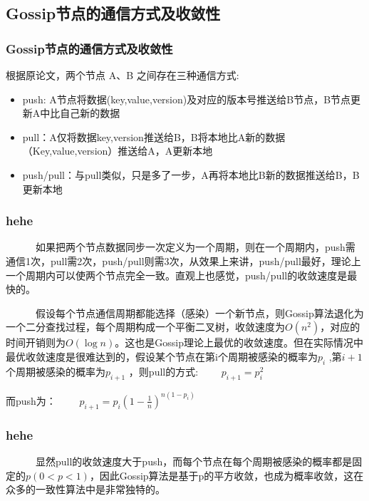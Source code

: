 \documentclass[slidestop,compress,mathserif,c]{beamer}
\begin{document}
\subsection{\hfill  Gossip节点的通信方式及收敛性}
\begin{frame}
\frametitle{ Gossip节点的通信方式及收敛性}
 根据原论文，两个节点 A、B 之间存在三种通信方式:
 \begin{itemize}
 \item push: A节点将数据(key,value,version)及对应的版本号推送给B节点，B节点更新A中比自己新的数据
 \item pull：A仅将数据key,version推送给B，B将本地比A新的数据（Key,value,version）推送给A，A更新本地
 \item push/pull：与pull类似，只是多了一步，A再将本地比B新的数据推送给B，B更新本地
 \end{itemize}
\end{frame}

\begin{frame}
\frametitle{hehe}
 ~~~~~~如果把两个节点数据同步一次定义为一个周期，则在一个周期内，push需通信1次，pull需2次，push/pull则需3次，从效果上来讲，push/pull最好，理论上一个周期内可以使两个节点完全一致。直观上也感觉，push/pull的收敛速度是最快的。

~~~~~~假设每个节点通信周期都能选择（感染）一个新节点，则Gossip算法退化为一个二分查找过程，每个周期构成一个平衡二叉树，收敛速度为$O(n^2)$，对应的时间开销则为$O(\log n)$。这也是Gossip理论上最优的收敛速度。但在实际情况中最优收敛速度是很难达到的，假设某个节点在第i个周期被感染的概率为$p_i$ ,第$i+1$个周期被感染的概率为$p_{i+1}$ ，则pull的方式:
~~~~$ p_{i+1} =p_i^2$

而push为：~~~~
$p_{i+1}=p_i(1-\frac{1}{n})^{n(1-p_i)}$
\end{frame}

\begin{frame}
\frametitle{hehe}
 ~~~~~~显然pull的收敛速度大于push，而每个节点在每个周期被感染的概率都是固定的$p(0<p<1)$，因此Gossip算法是基于p的平方收敛，也成为概率收敛，这在众多的一致性算法中是非常独特的。
\end{frame}
\end{document}
